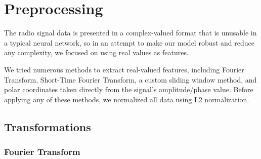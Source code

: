 \documentclass{turabian-thesis}
\begin{document}


\chapter{Preprocessing}
\label{chap:preprocessing}

The radio signal data is presented in a complex-valued format that is unusable in a typical neural network, so in an attempt to make our model robust and reduce any complexity, we focused on using real values as features.

We tried numerous methods to extract real-valued features, including Fourier Transform, Short-Time Fourier Transform, a custom sliding window method, and polar coordinates taken directly from the signal's amplitude/phase value. Before applying any of these methods, we normalized all data using L2 normalization.




\section{Transformations}


\subsection{Fourier Transform}
\end{document}

